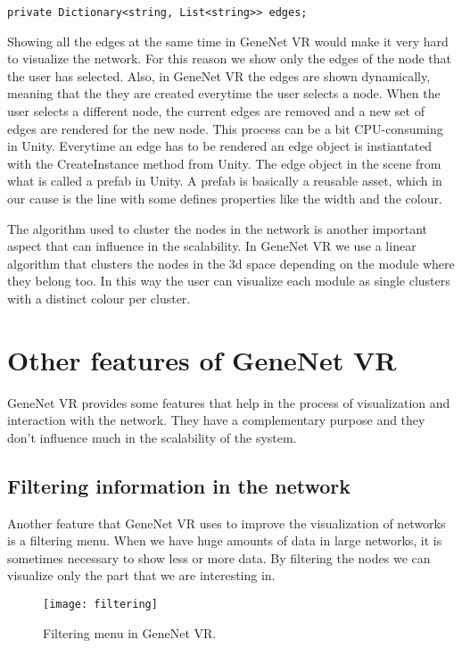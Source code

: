 \begin{verbatim}
private Dictionary<string, List<string>> edges;
\end{verbatim}

Showing all the edges at the same time in GeneNet VR would make it very hard to visualize the network. For this reason we show only the edges of the node that the user has selected. Also, in GeneNet VR the edges are shown dynamically, meaning that the they are created everytime the user selects a node. When the user selects a different node, the current edges are removed and a new set of edges are rendered for the new node. This process can be a bit CPU-consuming in Unity. Everytime an edge has to be rendered an edge object is instiantated with the CreateInstance method from Unity. The edge object in the scene from what is called a prefab in Unity. A prefab\cite{prefab} is basically a reusable asset, which in our cause is the line with some defines properties like the width and the colour.

The algorithm used to cluster the nodes in the network is another important aspect that can influence in the scalability. In GeneNet VR we use a linear algorithm that clusters the nodes in the 3d space depending on the module where they belong too. In this way the user can visualize each module as single clusters with a distinct colour per cluster.

\section{Other features of GeneNet VR}
GeneNet VR provides some features that help in the process of visualization and interaction with the network. They have a complementary purpose and they don't influence much in the scalability of the system.

\subsection{Filtering information in the network}
Another feature that GeneNet VR uses to improve the visualization of networks is a filtering menu. When we have huge amounts of data in large networks, it is sometimes necessary to show less or more data. By filtering the nodes we can visualize only the part that we are interesting in.

\begin{figure}[h!]
    \centering%
    \texttt{[image: filtering]}
    \caption{Filtering menu in GeneNet VR.}
    \label{fig:filtering}
\end{figure}%


